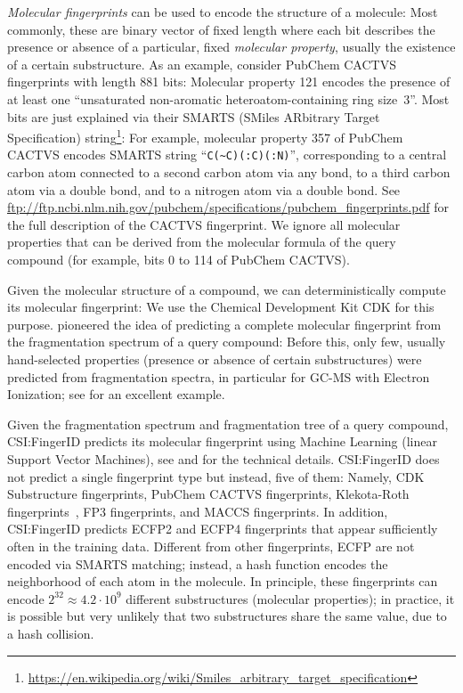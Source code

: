 \documentclass[letterpaper,10pt,openany,oneside]{sphinxmanual}
\begin{document}
\emph{Molecular fingerprints} can be used to encode the structure of a
molecule: Most commonly, these are binary vector of fixed length where each
bit describes the presence or absence of a particular, fixed \emph{molecular
property}, usually the existence of a certain substructure.  As an example,
consider PubChem CACTVS fingerprints with length 881 bits: Molecular property
121 encodes the presence of at least one ``unsaturated non-aromatic
heteroatom-containing ring size~3''.  Most bits are just explained via their
SMARTS (SMiles ARbitrary Target Specification)
string\footnote{\sphinxAtStartFootnote%
\url{https://en.wikipedia.org/wiki/Smiles_arbitrary_target_specification}}:
For example, molecular property 357 of PubChem CACTVS encodes SMARTS string
``\verb=C(~C)(:C)(:N)='', corresponding to a central carbon atom connected to
a second carbon atom via any bond, to a third carbon atom via a double bond,
and to a nitrogen atom via a double bond.
See \url{ftp://ftp.ncbi.nlm.nih.gov/pubchem/specifications/pubchem_fingerprints.pdf}
for the full description of the CACTVS fingerprint. We ignore all 
molecular properties that can be derived from the molecular formula of the query compound (for example, bits 0 to 114 of PubChem CACTVS).

Given the molecular structure of a compound, we can deterministically compute
its molecular fingerprint: We use the Chemical Development Kit CDK
\citep{steinbeck03chemistry, steinbeck06recent} for this
purpose.  \citet{heinonen12metabolite} pioneered the idea of predicting a
complete molecular fingerprint from the fragmentation spectrum of a query
compound: Before this, only few, usually hand-selected properties (presence
or absence of certain substructures) were predicted from fragmentation
spectra, in particular for GC-MS with Electron Ionization;
see \citet{curry90msnet} for an excellent example.

Given the fragmentation spectrum and fragmentation tree of a query compound,
CSI:FingerID predicts its molecular fingerprint using Machine Learning
(linear Support Vector Machines), see \citet{shen14metabolite}
and \citet{duehrkop15searching} for the technical details.  CSI:FingerID does
not predict a single fingerprint type but instead, five of them: Namely, CDK
Substructure fingerprints, PubChem CACTVS fingerprints, Klekota-Roth
fingerprints~\citep{klekota08chemical}, FP3 fingerprints, and MACCS
fingerprints.  In addition, CSI:FingerID predicts ECFP2 and ECFP4 fingerprints
\citep{rogers10extended} that appear sufficiently often in the training data.
Different from other fingerprints, ECFP are not encoded via SMARTS matching;
instead, a hash function encodes the neighborhood of each atom in the
molecule.  In principle, these fingerprints can encode $2^{32} \approx
4.2 \cdot 10^9$ different substructures (molecular properties); in practice,
it is possible but very unlikely that two substructures share the same value,
due to a hash collision.
\end{document}
